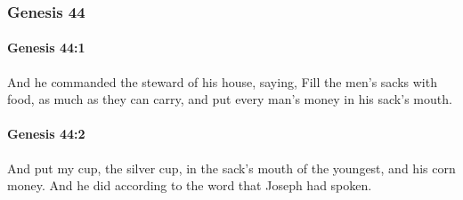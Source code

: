 	\subsubsection{Genesis 44} %
		\label{GENESIS-44}

		\paragraph{Genesis 44:1} %
			\label{GENESIS-44-1}

			And he commanded the steward of his house, saying, Fill the men's sacks with food, as much as they can carry, and put every man's money in his sack's mouth.


		\paragraph{Genesis 44:2} %
			\label{GENESIS-44-2}

			And put my cup, the silver cup, in the sack's mouth of the youngest, and his corn money. And he did according to the word that Joseph had spoken.

